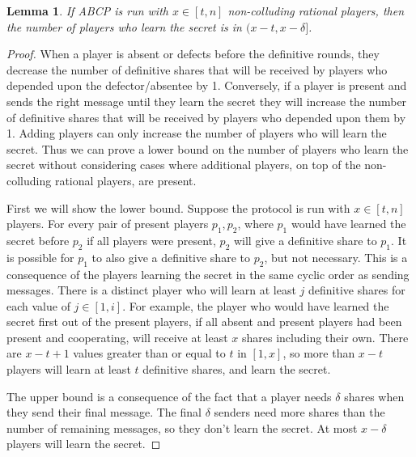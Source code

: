 \documentclass[12pt]{dalcsthesis}
\newtheorem{lemma}{Lemma}
\begin{document}
\begin{lemma}\label{Lem:ABCP:SomeDeltaLose}If ABCP is run with $x \in [t,n]$ non-colluding rational players, then the number of players who learn the secret is in $(x-t, x-\delta]$.\end{lemma}
\begin{proof}
When a player is absent or defects before the definitive rounds, they decrease the number of definitive shares that will be received by players who depended upon the defector/absentee by 1. Conversely, if a player is present and sends the right message until they learn the secret they will increase the number of definitive shares that will be received by players who depended upon them by 1. Adding players can only increase the number of players who will learn the secret. Thus we can prove a lower bound on the number of players who learn the secret without considering cases where additional players, on top of the non-colluding rational players, are present.

First we will show the lower bound. Suppose the protocol is run with $x \in [t,n]$ players. For every pair of present players $p_1, p_2$, where $p_1$ would have learned the secret before $p_2$ if all players were present, $p_2$ will give a definitive share to $p_1$. It is possible for $p_1$ to also give a definitive share to $p_2$, but not necessary. This is a consequence of the players learning the secret in the same cyclic order as sending messages. There is a distinct player who will learn at least $j$ definitive shares for each value of $j \in [1, i]$. For example, the player who would have learned the secret first out of the present players, if all absent and present players had been present and cooperating, will receive at least $x$ shares including their own. There are $x-t+1$ values greater than or equal to $t$ in $[1,x]$, so more than $x-t$ players will learn at least $t$ definitive shares, and learn the secret.

The upper bound is a consequence of the fact that a player needs $\delta$ shares when they send their final message. The final $\delta$ senders need more shares than the number of remaining messages, so they don't learn the secret. At most $x-\delta$ players will learn the secret.  
\end{proof}
\end{document}
